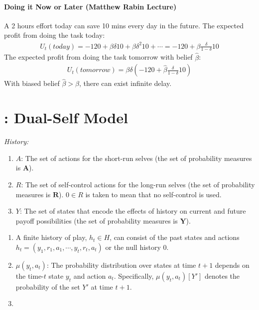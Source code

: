 \documentclass[11pt]{elegantbook}
\begin{document}
\paragraph*{Doing it Now or Later (Matthew Rabin Lecture)}
A 2 hours effort today can save 10 mins every day in the future. The expected profit from doing the task today:
\begin{equation}
    \begin{aligned}
        U_t(today)=-120+\beta \delta 10 + \beta \delta^2 10 + \cdots=-120+\beta\frac{\delta}{1-\delta}10
    \end{aligned}
    \nonumber
\end{equation}
The expected profit from doing the task tomorrow with belief $\hat{\beta}$:
\begin{equation}
    \begin{aligned}
        U_t(tomorrow)=\beta\delta\left(-120+\hat{\beta}\frac{\delta}{1-\delta}10\right)
    \end{aligned}
    \nonumber
\end{equation}
With biased belief $\hat{\beta}>\beta$, there can exist infinite delay.



\section{\cite{fudenberg2006dual}: Dual-Self Model}
\textit{History:}
\begin{enumerate}
    \item $A$: The set of actions for the short-run selves (the set of probability measures is $\mathbf{A}$).
    \item $R$: The set of self-control actions for the long-run selves (the set of probability measures is $\mathbf{R}$). $0\in R$ is taken to mean that no self-control is used.
    \item $Y$: The set of states that encode the effects of history on current and future payoff possibilities (the set of probability measures is $\mathbf{Y}$).
\end{enumerate}

\begin{enumerate}
    \item A finite history of play, $h_t\in H$, can consist of the past states and actions $h_t=(y_1,r_1,a_1,\cdots,y_t,r_t,a_t)$ or the null history $0$.
    \item $\mu(y_t,a_t)$: The probability distribution over states at time $t+1$ depends on the time-$t$ state $y_t$ and action $a_t$. Specifically, $\mu(y_t,a_t)[Y']$ denotes the probability of the set $Y'$ at time $t+1$.
    \item 
\end{enumerate}
















\end{document}
